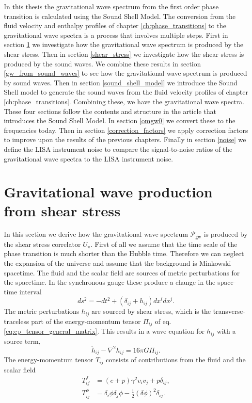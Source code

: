 In this thesis the gravitational wave spectrum from the first order phase transition is calculated using the Sound Shell Model.
The conversion from the fluid velocity and enthalpy profiles of chapter \ref{ch:phase_transitions} to the gravitational wave spectra
is a process that involves multiple steps.
First in section \ref{gw_production} we investigate how the gravitational wave spectrum is produced by the shear stress.
Then in section \ref{shear_stress} we investigate how the shear stress is produced by the sound waves.
We combine these results in section \ref{gw_from_sound_waves} to see how the gravitational wave spectrum is produced by sound waves.
Then in section \ref{sound_shell_model} we introduce the Sound Shell model to generate the sound waves from the fluid velocity profiles of chapter \ref{ch:phase_transitions}.
Combining these, we have the gravitational wave spectra.
These four sections follow the contents and structure in the article \cite{hindmarsh_gw_pt_2019} that introduces the Sound Shell Model.
In section \ref{omgw0} we convert these to the frequencies today.
Then in section \ref{correction_factors} we apply correction factors to improve upon the results of the previous chapters.
Finally in section \ref{noise} we define the LISA instrument noise to compare the signal-to-noise ratios of the gravitational wave spectra to the LISA instrument noise.


\section{Gravitational wave production from shear stress}
\label{gw_production}
In this section we derive how the gravitational wave spectrum $\mathcal{P}_\text{gw}$ is produced by the shear stress correlator $U_\pi$.
First of all we assume that the time scale of the phase transition is much shorter than the Hubble time.
Therefore we can neglect the expansion of the universe and assume that the background is Minkowski spacetime.
The fluid and the scalar field are sources of metric perturbations for the spacetime.
In the synchronous gauge these produce a change in the space-time interval
\cite[p. 7]{hindmarsh_gw_pt_2019}
\begin{equation}
ds^2 = -dt^2 + (\delta_{ij} + h_{ij}) dx^i dx^j.
\end{equation}
The metric perturbations $h_{ij}$ are sourced by shear stress,
which is the transverse-traceless part of the energy-momentum tensor $\Pi_{ij}$ of eq. \eqref{eq:ep_tensor_general_matrix}.
This results in a wave equation for $h_{ij}$ with a source term,
\cites[eq. 3.1]{hindmarsh_gw_pt_2019}[eq. 1.24]{maggiore_gw_2008}
\begin{equation}
\ddot{h}_{ij} - \nabla^2 h_{ij} = 16 \pi G \Pi_{ij}.
\end{equation}
The energy-momentum tensor $T_{ij}$ consists of contributions from the fluid and the scalar field \cite[p. 7]{hindmarsh_gw_pt_2019}
\begin{align}
T^f_{ij}    &= (e+p) \gamma^2 v_i v_j + p \delta_{ij}, \\
T^\phi_{ij} &= \delta_i \phi \delta_j \phi - \frac{1}{2}(\delta \phi)^2 \delta_{ij}.
\end{align}

